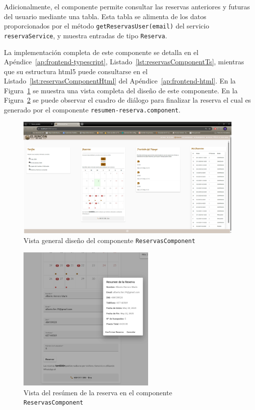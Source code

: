 Adicionalmente, el componente permite consultar las reservas anteriores y futuras del usuario mediante una tabla. Esta tabla se alimenta de los datos proporcionados por el método \texttt{getReservasUser(email)} del servicio \texttt{reservaService}, y muestra entradas de tipo \texttt{Reserva}.

La implementación completa de este componente se detalla en el Apéndice~\ref{ap:frontend-typescript}, Listado~\ref{lst:reservasComponentTs}, mientras que su estructura \gls{html5} puede consultarse en el Listado~\ref{lst:reservasComponentHtml} del Apéndice~\ref{ap:frontend-html}.
En la Figura~\ref{fig:reservas-component} se muestra una vista completa del diseño de este componente. En la Figura~\ref{fig:reservas-resumen-component} se puede observar el cuadro de diálogo para finalizar la reserva el cual es generado por el componente \texttt{resumen-reserva.component}. 
    
\begin{figure}
    
    \centering
    \includegraphics[width=1\textwidth]{figs/reservas.png}
    \caption{Vista general diseño del componente \texttt{ReservasComponent}}
    \label{fig:reservas-component}
\end{figure}

\begin{figure}

    \centering
        \includegraphics[width=0.6\textwidth]{figs/resumen-reserva.png}
        \caption{Vista del resúmen de la reserva en el componente \texttt{ReservasComponent}}
        \label{fig:reservas-resumen-component}
\end{figure}
